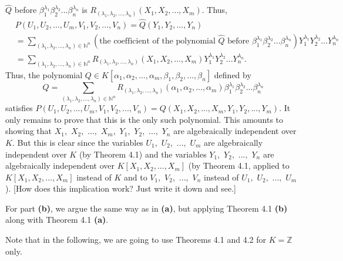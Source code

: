 \documentclass[12pt,final,notitlepage,onecolumn,german]{article}%
\begin{document}
$\widehat{Q}$ before $\beta_{1}^{\lambda_{1}}\beta_{2}^{\lambda_{2}}%
...\beta_{n}^{\lambda_{n}}$ is $R_{\left(  \lambda_{1},\lambda_{2}%
,...,\lambda_{n}\right)  }\left(  X_{1},X_{2},...,X_{m}\right)  $. Thus,%
\begin{align*}
&  P\left(  U_{1},U_{2},...,U_{m},V_{1},V_{2},...,V_{n}\right)  =\widehat
{Q}\left(  Y_{1},Y_{2},...,Y_{n}\right) \\
&  =\sum_{\left(  \lambda_{1},\lambda_{2},...,\lambda_{n}\right)
\in\mathbb{N}^{n}}\left(  \text{the coefficient of the polynomial }\widehat
{Q}\text{ before }\beta_{1}^{\lambda_{1}}\beta_{2}^{\lambda_{2}}...\beta
_{n}^{\lambda_{n}}\right)  Y_{1}^{\lambda_{1}}Y_{2}^{\lambda_{2}}%
...Y_{n}^{\lambda_{n}}\\
&  =\sum_{\left(  \lambda_{1},\lambda_{2},...,\lambda_{n}\right)
\in\mathbb{N}^{n}}R_{\left(  \lambda_{1},\lambda_{2},...,\lambda_{n}\right)
}\left(  X_{1},X_{2},...,X_{m}\right)  Y_{1}^{\lambda_{1}}Y_{2}^{\lambda_{2}%
}...Y_{n}^{\lambda_{n}}.
\end{align*}
Thus, the polynomial $Q\in K\left[  \alpha_{1},\alpha_{2},...,\alpha_{m}%
,\beta_{1},\beta_{2},...,\beta_{n}\right]  $ defined by%
\[
Q=\sum_{\left(  \lambda_{1},\lambda_{2},...,\lambda_{n}\right)  \in
\mathbb{N}^{n}}R_{\left(  \lambda_{1},\lambda_{2},...,\lambda_{n}\right)
}\left(  \alpha_{1},\alpha_{2},...,\alpha_{m}\right)  \beta_{1}^{\lambda_{1}%
}\beta_{2}^{\lambda_{2}}...\beta_{n}^{\lambda_{n}}%
\]
satisfies $P\left(  U_{1},U_{2},...,U_{m},V_{1},V_{2},...,V_{n}\right)
=Q\left(  X_{1},X_{2},...,X_{m},Y_{1},Y_{2},...,Y_{m}\right)  $. It only
remains to prove that this is the only such polynomial. This amounts to
showing that $X_{1},$ $X_{2},$ $...,$ $X_{m},$ $Y_{1},$ $Y_{2},$ $...,$
$Y_{n}$ are algebraically independent over $K$. But this is clear since the
variables $U_{1},$ $U_{2},$ $...,$ $U_{m}$ are algebraically independent over
$K$ (by Theorem 4.1) and the variables $Y_{1},$ $Y_{2},$ $...,$ $Y_{n}$ are
algebraically independent over $K\left[  X_{1},X_{2},...,X_{m}\right]  $ (by
Theorem 4.1, applied to $K\left[  X_{1},X_{2},...,X_{m}\right]  $ instead of
$K$ and to $V_{1},$ $V_{2},$ $...,$ $V_{n}$ instead of $U_{1},$ $U_{2},$
$...,$ $U_{m}$). [How does this implication work? Just write it down and see.]

For part \textbf{(b)}, we argue the same way as in \textbf{(a)}, but applying
Theorem 4.1 \textbf{(b)} along with Theorem 4.1 \textbf{(a)}.

Note that in the following, we are going to use Theorems 4.1 and 4.2 for
$K=\mathbb{Z}$ only.
\end{document}
